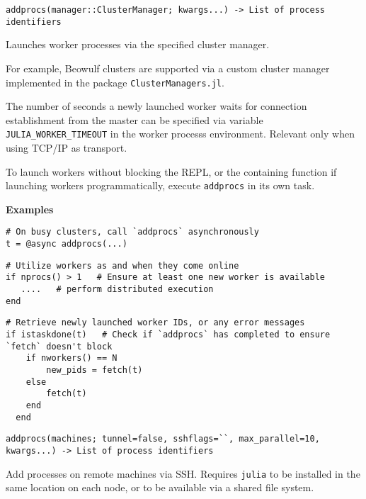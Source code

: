 \begin{adjustwidth}{2em}{0pt}


\begin{verbatim}
addprocs(manager::ClusterManager; kwargs...) -> List of process identifiers
\end{verbatim}

Launches worker processes via the specified cluster manager.

For example, Beowulf clusters are supported via a custom cluster manager implemented in the package \texttt{ClusterManagers.jl}.

The number of seconds a newly launched worker waits for connection establishment from the master can be specified via variable \texttt{JULIA\_WORKER\_TIMEOUT} in the worker process{\textquotesingle}s environment. Relevant only when using TCP/IP as transport.

To launch workers without blocking the REPL, or the containing function if launching workers programmatically, execute \texttt{addprocs} in its own task.

\textbf{Examples}


\begin{lstlisting}
# On busy clusters, call `addprocs` asynchronously
t = @async addprocs(...)
\end{lstlisting}


\begin{lstlisting}
# Utilize workers as and when they come online
if nprocs() > 1   # Ensure at least one new worker is available
   ....   # perform distributed execution
end
\end{lstlisting}


\begin{lstlisting}
# Retrieve newly launched worker IDs, or any error messages
if istaskdone(t)   # Check if `addprocs` has completed to ensure `fetch` doesn't block
    if nworkers() == N
        new_pids = fetch(t)
    else
        fetch(t)
    end
  end
\end{lstlisting}




\begin{lstlisting}
addprocs(machines; tunnel=false, sshflags=``, max_parallel=10, kwargs...) -> List of process identifiers
\end{lstlisting}

Add processes on remote machines via SSH. Requires \texttt{julia} to be installed in the same location on each node, or to be available via a shared file system.


\end{adjustwidth}
